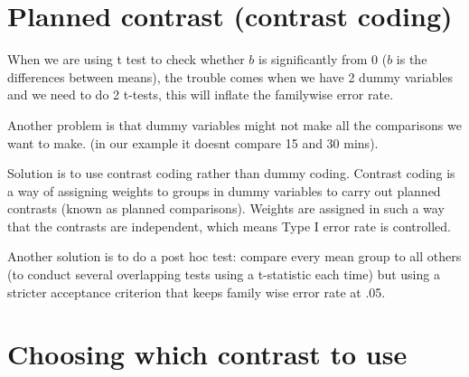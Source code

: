 \section{Planned contrast (contrast coding)}
When we are using t test to check whether $b$ is significantly from 0 ($b$ is the differences between means), the trouble comes when we have 2 dummy variables and we need to do 2 t-tests, this will inflate the familywise error rate. 

Another problem is that dummy variables might not make all the comparisons we want to make. (in our example it doesnt compare 15 and 30 mins).

Solution is to use contrast coding rather than dummy coding. Contrast coding is a way of assigning weights to groups in dummy variables to carry out planned contrasts (known as planned comparisons). Weights are assigned in such a way that the contrasts are independent, which means Type I error rate is controlled. 

Another solution is to do a post hoc test: compare every mean group to all others (to conduct several overlapping tests using a t-statistic each time) but using a stricter acceptance criterion that keeps family wise error rate at .05. 

\section{Choosing which contrast to use}